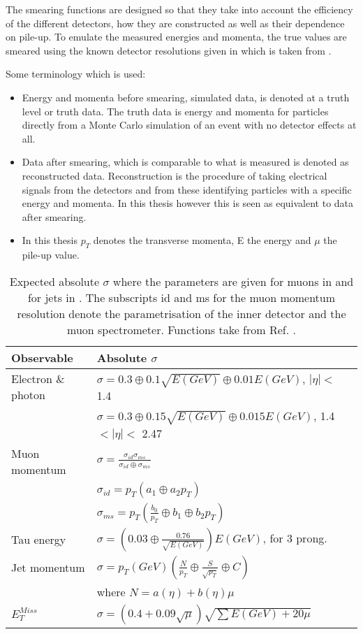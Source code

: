 The smearing functions are designed so that they take into account the efficiency of the different detectors, how they are constructed as well as their dependence on pile-up. To emulate the measured energies and momenta, the true values are smeared using the known detector resolutions given in  which is taken from \citep{ATL-PHYS-PUB-2013-004}. 

Some terminology which is used:
\begin{itemize}
\item Energy and momenta before smearing, simulated data, is denoted at a truth level or truth data. The truth data is energy and momenta for particles directly from a Monte Carlo simulation of an event with no detector effects at all.
\item Data after smearing, which is comparable to what is measured is denoted as reconstructed data. Reconstruction is the procedure of taking electrical signals from the detectors and from these identifying particles with a specific energy and momenta. In this thesis however this is seen as equivalent to data after smearing.
\item In this thesis $p_T$ denotes the transverse momenta, E the energy and $\mu$ the pile-up value.
\end{itemize}

\newpage
\begin{table}[H]
\renewcommand{\arraystretch}{1.5} %
\begin{center}
\begin{tabular}{|l|l|}
\hline
Observable & Absolute $\sigma$ \\ \hline
Electron \& photon & $\sigma=0.3\oplus 0.1\sqrt{E(GeV)}\oplus 0.01E(GeV)$, $|\eta|<$ 1.4 \\
& $\sigma=0.3\oplus 0.15\sqrt{E(GeV)}\oplus 0.015E(GeV)$, 1.4 $<|\eta|<$ 2.47 \\ \hline 
Muon momentum& $\sigma=\frac{\sigma_{id} \sigma_{ms}}{\sigma_{id} \oplus \sigma_{ms}}$\\
& $\sigma_{id}=p_T(a_1 \oplus a_2 p_T)$\\
& $\sigma_{ms}=p_T(\frac{b_0}{p_T} \oplus b_1 \oplus b_2 p_T)$\\ \hline
Tau energy& $\sigma =(0.03\oplus \frac{0.76}{\sqrt{E(GeV)}})E(GeV)$, for 3 prong.\\ \hline
Jet momentum& $\sigma = p_T(GeV)(\frac{N}{p_T} \oplus \frac{S}{\sqrt{p_T}} \oplus C)$ \\ 
& where $N=a(\eta)+b(\eta)\mu$ \\ \hline
$E_T^{Miss}$ & $\sigma = (0.4+0.09\sqrt{\mu})\sqrt{\sum E(GeV)+20\mu}$ \\ \hline
\end{tabular}
\end{center}
\renewcommand{\arraystretch}{1.0} %
\caption{Expected absolute $\sigma$ where the parameters are given for muons in  and for jets in . The subscripts id and ms for the muon momentum resolution denote the parametrisation of the inner detector and the muon spectrometer. Functions take from Ref. \citep{ATL-PHYS-PUB-2013-004}.}
\label{tab:expected sigma}
\end{table}

